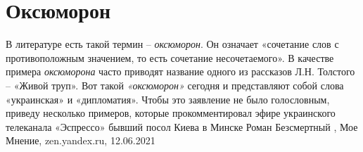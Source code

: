  
 
 
 
 
\chapter{Оксюморон}

В литературе есть такой термин – \emph{оксюморон}. Он означает «сочетание слов с
противоположным значением, то есть сочетание несочетаемого». В качестве примера
\emph{оксюморона} часто приводят название одного из рассказов Л.Н. Толстого – «Живой
труп». Вот такой \emph{«оксюморон»} сегодня и представляют собой слова «украинская» и
«дипломатия». Чтобы это заявление не было голословным, приведу несколько
примеров, которые прокомментировал эфире украинского телеканала «Эспрессо»
бывший посол Киева в Минске Роман Безсмертный
, 
Мое Мнение, zen.yandex.ru, 12.06.2021

